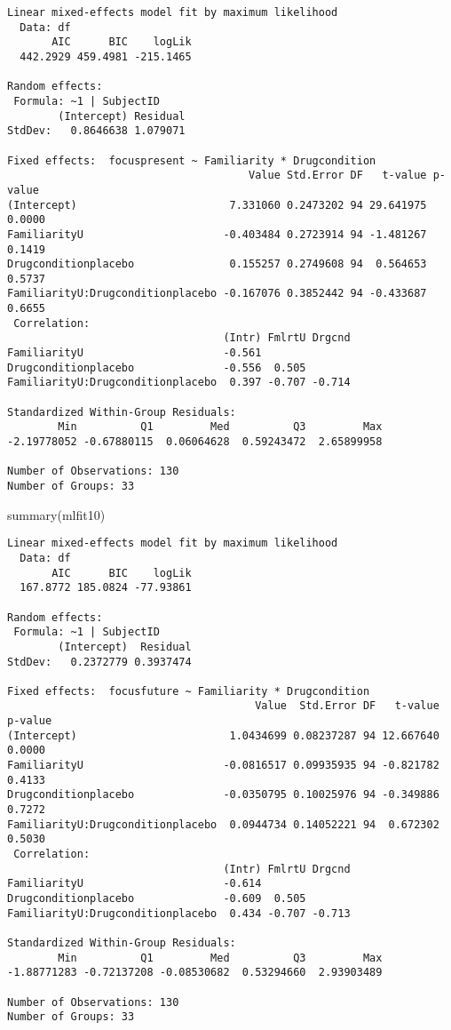 \documentclass[
  man,
  longtable,
  nolmodern,
  notxfonts,
  notimes,
  colorlinks=true,linkcolor=blue,citecolor=blue,urlcolor=blue]{apa7}
\newenvironment{Shaded}{\begin{snugshade}}{\end{snugshade}}
\newcommand{\FunctionTok}[1]{\textcolor[rgb]{0.28,0.35,0.67}{#1}}
\newcommand{\NormalTok}[1]{\textcolor[rgb]{0.00,0.23,0.31}{#1}}
\begin{document}
\begin{verbatim}
Linear mixed-effects model fit by maximum likelihood
  Data: df 
       AIC      BIC    logLik
  442.2929 459.4981 -215.1465

Random effects:
 Formula: ~1 | SubjectID
        (Intercept) Residual
StdDev:   0.8646638 1.079071

Fixed effects:  focuspresent ~ Familiarity * Drugcondition 
                                      Value Std.Error DF   t-value p-value
(Intercept)                        7.331060 0.2473202 94 29.641975  0.0000
FamiliarityU                      -0.403484 0.2723914 94 -1.481267  0.1419
Drugconditionplacebo               0.155257 0.2749608 94  0.564653  0.5737
FamiliarityU:Drugconditionplacebo -0.167076 0.3852442 94 -0.433687  0.6655
 Correlation: 
                                  (Intr) FmlrtU Drgcnd
FamiliarityU                      -0.561              
Drugconditionplacebo              -0.556  0.505       
FamiliarityU:Drugconditionplacebo  0.397 -0.707 -0.714

Standardized Within-Group Residuals:
        Min          Q1         Med          Q3         Max 
-2.19778052 -0.67880115  0.06064628  0.59243472  2.65899958 

Number of Observations: 130
Number of Groups: 33 
\end{verbatim}

\begin{Shaded}
\begin{Highlighting}[]
\FunctionTok{summary}\NormalTok{(mlfit10)}
\end{Highlighting}
\end{Shaded}

\begin{verbatim}
Linear mixed-effects model fit by maximum likelihood
  Data: df 
       AIC      BIC    logLik
  167.8772 185.0824 -77.93861

Random effects:
 Formula: ~1 | SubjectID
        (Intercept)  Residual
StdDev:   0.2372779 0.3937474

Fixed effects:  focusfuture ~ Familiarity * Drugcondition 
                                       Value  Std.Error DF   t-value p-value
(Intercept)                        1.0434699 0.08237287 94 12.667640  0.0000
FamiliarityU                      -0.0816517 0.09935935 94 -0.821782  0.4133
Drugconditionplacebo              -0.0350795 0.10025976 94 -0.349886  0.7272
FamiliarityU:Drugconditionplacebo  0.0944734 0.14052221 94  0.672302  0.5030
 Correlation: 
                                  (Intr) FmlrtU Drgcnd
FamiliarityU                      -0.614              
Drugconditionplacebo              -0.609  0.505       
FamiliarityU:Drugconditionplacebo  0.434 -0.707 -0.713

Standardized Within-Group Residuals:
        Min          Q1         Med          Q3         Max 
-1.88771283 -0.72137208 -0.08530682  0.53294660  2.93903489 

Number of Observations: 130
Number of Groups: 33 
\end{verbatim}
\end{document}
